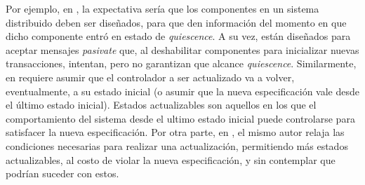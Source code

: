 Por ejemplo, en \cite{60317}, la expectativa sería que los componentes en un sistema distribuido deben ser diseñados, para que
den información del momento en que dicho componente entró en estado de \emph{quiescence}. A su vez, están diseñados para aceptar mensajes
\emph{pasivate} que, al deshabilitar componentes para inicializar nuevas transacciones, intentan, pero no garantizan
que alcance \emph{quiescence}. Similarmente, en \cite{6224401} requiere asumir que el controlador a ser actualizado va a
volver, eventualmente, a su estado inicial (o asumir que la nueva especificación vale desde el último estado inicial). Estados
actualizables son aquellos en los que el comportamiento del sistema desde el ultimo estado inicial puede controlarse
para satisfacer la nueva especificación.  Por otra parte, en \cite{PanzicaLaManna:2013:FCC:2487336.2487349}, el mismo
autor relaja las condiciones necesarias para realizar una actualización, permitiendo más estados actualizables, al
costo de violar la nueva especificación, y sin contemplar que podrían suceder con estos.




